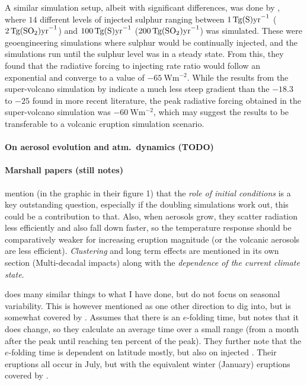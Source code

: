 \documentclass[twocol]{ametsocV5}
\begin{document}
A similar simulation setup, albeit with significant differences, was done by
\citet{niemeier2015}, where \(14\) different levels of injected sulphur ranging between
\(\SI{1}{\tera\gram(\ce{S})\mathrm{yr}^{-1}}\)
(\(\SI{2}{\tera\gram(\ce{SO2})\mathrm{yr}^{-1}}\)) and
\(\SI{100}{\tera\gram(\ce{S})\mathrm{yr}^{-1}}\)
(\(\SI{200}{\tera\gram(\ce{SO2})\mathrm{yr}^{-1}}\)) was simulated. These were
geoengineering simulations where sulphur would be continually injected, and the
simulations run until the sulphur level was in a steady state. From this, they found
that the radiative forcing to injecting rate ratio would follow an exponential and
converge to a value of \(\SI{-65}{\watt\metre^{-2}}\). While the results from the
super-volcano simulation by \citet{jones2005} indicate a much less steep gradient than
the \(-18.3\) to \(-25\) found in more recent literature, the peak radiative forcing
obtained in the super-volcano simulation was \(\SI{-60}{\watt\metre^{-2}}\), which may
suggest the \citet{niemeier2015} results to be transferable to a volcanic eruption
simulation scenario.


\paragraph*{On aerosol evolution and atm.\ dynamics (TODO)}


\paragraph*{Marshall papers (still notes)}

\citet{marshall2022} mention (in the graphic in their figure 1) that the \emph{role of
  initial conditions} is a key outstanding question, especially if the 
doubling simulations work out, this could be a contribution to that.
Also, when aerosols grow, they scatter radiation less efficiently and also fall down
faster, so the temperature response should be comparatively weaker for increasing
eruption magnitude (or the volcanic aerosols are less efficient). \emph{Clustering} and
long term effects are mentioned in its own section (Multi-decadal impacts) along with
the \emph{dependence of the current climate state}.

\citet{marshall2019} does many similar things to what I have done, but do not focus on
seasonal variability. This is however mentioned as one other direction to dig into, but
is somewhat covered by \citet{marshall2020}. Assumes that there is an $e$-folding time,
but notes that it does change, so they calculate an average time over a small range
(from a month after the peak until reaching ten percent of the peak). They further note
that the $e$-folding time is dependent on latitude mostly, but also on injected
. Their eruptions all occur in July, but with the equivalent winter (January)
eruptions covered by \citet{marshall2020}.
\end{document}
